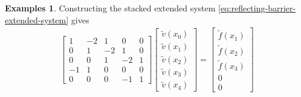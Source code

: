 \documentclass[11pt]{article}
\theoremstyle{definition}
\newtheorem{example}{Examples}[section]
\begin{document}
\begin{example}
	Constructing the stacked extended system \eqref{eq:reflecting-barrier-extended-system} gives
	\begin{align}\label{eq:extended-system-reflecting-barrier-before-gaussian-elimination}
	\begin{bmatrix}
	1 & -2 & 1 & 0 & 0 \\
	0 & 1 & -2 & 1 & 0 \\
	0 & 0 & 1 & -2 & 1 \\
	-1 & 1  & 0 & 0 & 0 \\
	0 & 0 & 0 & -1 & 1
	\end{bmatrix}
	\begin{bmatrix}
	\tilde{v}(x_0) \\
	\tilde{v}(x_1) \\
	\tilde{v}(x_2) \\
	\tilde{v}(x_3) \\
	\tilde{v}(x_4)
	\end{bmatrix}
	=
	\begin{bmatrix}
	\tilde{f}(x_1) \\
	\tilde{f}(x_2) \\
	\tilde{f}(x_3) \\
	0 \\
	0
	\end{bmatrix}
	\end{align}


\end{example}
\end{document}
